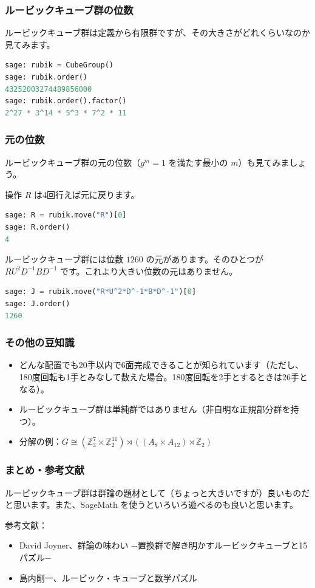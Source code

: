 \documentclass{beamer}
\begin{document}
\begin{frame}[fragile]
    \frametitle{ルービックキューブ群の位数}

    ルービックキューブ群は定義から有限群ですが、その大きさがどれくらいなのか見てみます。

    \begin{lstlisting}[language=Python]
sage: rubik = CubeGroup()
sage: rubik.order()
43252003274489856000
sage: rubik.order().factor()
2^27 * 3^14 * 5^3 * 7^2 * 11
    \end{lstlisting}
\end{frame}

\begin{frame}[fragile]
    \frametitle{元の位数}

    ルービックキューブ群の元の位数（\(g^m = 1\) を満たす最小の \(m\)）も見てみましょう。

    \bigskip

    操作 \(R\) は4回行えば元に戻ります。

    \begin{lstlisting}[language=Python]
sage: R = rubik.move("R")[0]
sage: R.order()
4
    \end{lstlisting}

    ルービックキューブ群には位数 \(1260\) の元があります。そのひとつが \(R U^2 D^{-1} B D^{-1}\) です。これより大きい位数の元はありません。

    \begin{lstlisting}[language=Python]
sage: J = rubik.move("R*U^2*D^-1*B*D^-1")[0]
sage: J.order()
1260
    \end{lstlisting}
\end{frame}

\begin{frame}
    \frametitle{その他の豆知識}

    \begin{itemize}
        \item どんな配置でも20手以内で6面完成できることが知られています（ただし、180度回転も1手とみなして数えた場合。180度回転を2手とするときは26手となる）。
        \item ルービックキューブ群は単純群ではありません（非自明な正規部分群を持つ）。
        \item 分解の例：\(G \cong (\mathbb{Z}_{3}^{7} \times \mathbb{Z}_{2}^{11}) \rtimes ((A_{8} \times A_{12}) \rtimes \mathbb{Z}_{2})\)
    \end{itemize}
\end{frame}

\begin{frame}
    \frametitle{まとめ・参考文献}

    ルービックキューブ群は群論の題材として（ちょっと大きいですが）良いものだと思います。また、SageMath を使うといろいろ遊べるのも良いと思います。

    \bigskip

    参考文献：

    \begin{itemize}
        \item David Joyner、群論の味わい −置換群で解き明かすルービックキューブと15パズル−
        \item 島内剛一、ルービック・キューブと数学パズル
    \end{itemize}
\end{frame}
\end{document}
